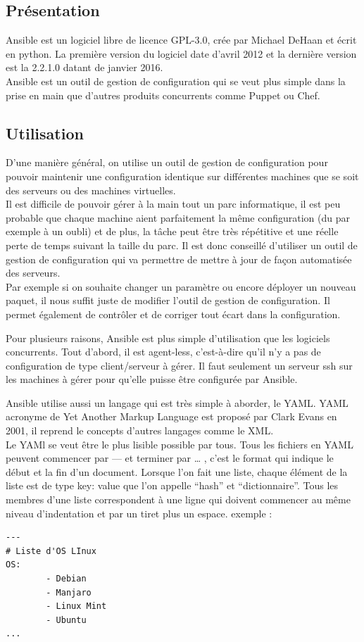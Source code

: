 \documentclass[]{article}
\begin{document}
\subsection{Présentation}\label{pruxe9sentation}

Ansible est un logiciel libre de licence GPL-3.0, crée par Michael
DeHaan et écrit en python. La première version du logiciel date d'avril
2012 et la dernière version est la 2.2.1.0 datant de janvier 2016. \\
Ansible est un outil de gestion de configuration qui se veut plus simple
dans la prise en main que d'autres produits concurrents comme Puppet ou
Chef.

\subsection{Utilisation}\label{utilisation}

D'une manière général, on utilise un outil de gestion de configuration
pour pouvoir maintenir une configuration identique sur différentes
machines que se soit des serveurs ou des machines virtuelles. \\
Il est difficile de pouvoir gérer à la main tout un parc informatique, il est
peu probable que chaque machine aient parfaitement la même configuration
(du par exemple à un oubli) et de plus, la tâche peut être très
répétitive et une réelle perte de temps suivant la taille du parc. Il
est donc conseillé d'utiliser un outil de gestion de configuration qui
va permettre de mettre à jour de façon automatisée des serveurs. \\
Par exemple si on souhaite changer un paramètre ou encore déployer un
nouveau paquet, il nous suffit juste de modifier l'outil de gestion de
configuration. Il permet également de contrôler et de corriger tout
écart dans la configuration.

Pour plusieurs raisons, Ansible est plus simple d'utilisation que les logiciels concurrents. Tout d'abord, il est
agent-less, c'est-à-dire qu'il n'y a pas de configuration de type
client/serveur à gérer. Il faut seulement un serveur ssh sur les
machines à gérer pour qu'elle puisse être configurée par Ansible.

Ansible utilise aussi un langage qui est très simple à aborder, le YAML.
YAML acronyme de Yet Another Markup Language est proposé par Clark Evans
en 2001, il reprend le concepts d'autres langages comme le XML. \\
Le YAMl se veut être le plus lisible possible par tous. Tous les fichiers en
YAML peuvent commencer par --- et terminer par \ldots{} , c'est le
format qui indique le début et la fin d'un document. 
Lorsque l'on fait une liste, chaque élément de la liste est de type \og
key: value \fg que l'on appelle ``hash'' et
``dictionnaire''. Tous les membres d'une liste correspondent à une ligne
qui doivent commencer au même niveau d'indentation et par un tiret plus
un espace. exemple :
\begin{verbatim}
---
# Liste d'OS LInux
OS:
        - Debian
        - Manjaro
        - Linux Mint
        - Ubuntu
...
\end{verbatim}
\end{document}

